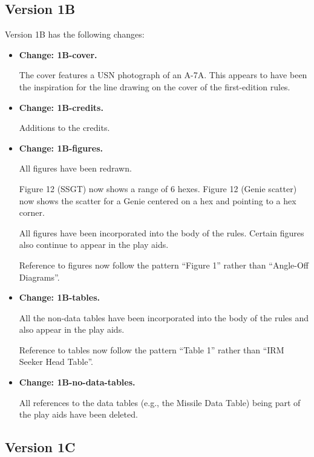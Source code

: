 \documentclass{report}
\newcommand{\changetag}[1]{\textbf{Change: #1.}\par}
\begin{document}
\subsection{Version 1B}

Version 1B has the following changes:

\begin{itemize}

    \item\changetag{1B-cover}

        The cover features a USN photograph of an A-7A. This appears to have been the inspiration for the line drawing on the cover of the first-edition {\AirPow} rules.

    \item\changetag{1B-credits}

        Additions to the credits.

    \item\changetag{1B-figures}

        All figures have been redrawn.

        Figure 12 (SSGT) now shows a range of 6 hexes. Figure 12 (Genie scatter) now shows the scatter for a Genie centered on a hex and pointing to a hex corner.

        All figures have been incorporated into the body of the rules. Certain figures also continue to appear in the play aids.

        Reference to figures now follow the pattern “Figure 1” rather than “Angle-Off Diagrams”.

    \item\changetag{1B-tables}

        All the non-data tables have been incorporated into the body of the rules and also appear in the play aids.

        Reference to tables now follow the pattern “Table 1” rather than “IRM Seeker Head Table”.

    \item\changetag{1B-no-data-tables}

        All references to the data tables (e.g., the Missile Data Table) being part of the play aids have been deleted.

\end{itemize}

\subsection{Version 1C}
\end{document}
